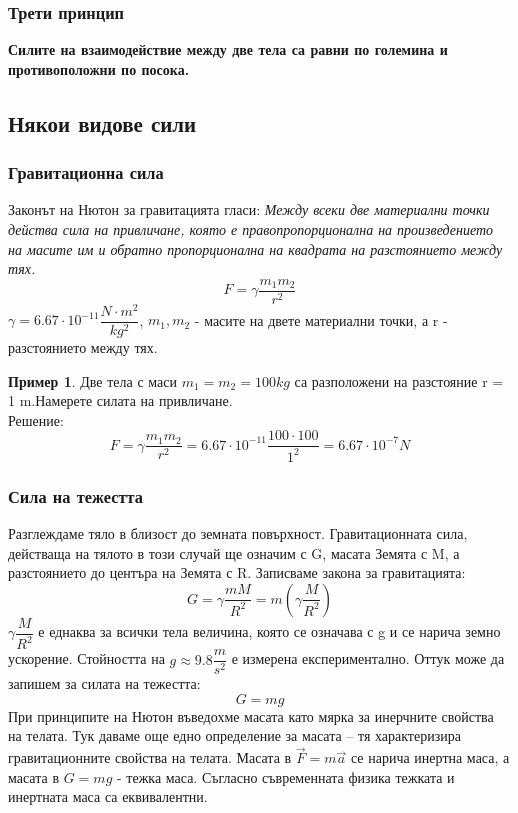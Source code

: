 \documentclass[fleqn, 12pt]{article}
\theoremstyle{definition}
\newtheorem{example}{Пример}[subsection]
\begin{document}
\subsubsection{Трети принцип}
\textbf{Силите на взаимодействие между две тела са равни по големина и противоположни по посока.}

\subsection{Някои видове сили}

\subsubsection{Гравитационна сила}
Законът на Нютон за гравитацията гласи: \textit{Между всеки две материални точки действа сила на привличане, която е правопропорционална на произведението на масите им и обратно пропорционална на квадрата на разстоянието между тях.} \\
$$F = \gamma \dfrac{m_1 m_2}{r^2}$$
$\gamma = 6.67 \cdot 10^{-11} \dfrac{N \cdot m^2}{kg^2}$, $m_1, m_2$ - масите на двете материални точки, а r - разстоянието между тях. 

\begin{example}
Две тела с маси $m_1 =m_2 = 100 kg$ са разположени на разстояние r = 1 m.Намерете силата на привличане. \\
Решение: \\
$$F = \gamma \dfrac{m_1 m_2}{r^2} =  6.67 \cdot 10^{-11}  \dfrac{100 \cdot 100}{1^2} = 6.67 \cdot 10^{-7} N$$
\end{example}


\subsubsection{Сила на тежестта}
Разглеждаме тяло в близост до земната повърхност. Гравитационната сила, действаща на тялото в този случай ще означим с G, масата Земята с M, а разстоянието до центъра на Земята с R. Записваме закона за гравитацията:
$$G = \gamma \dfrac{mM}{R^2} = m \left( \gamma \dfrac{M}{R^2} \right)$$
$\gamma \dfrac{M}{R^2} $ е еднаква за всички тела величина, която се означава с g и се нарича земно ускорение. Стойността на $g \approx 9.8 \dfrac{m}{s^2}$ е измерена експериментално. Оттук може да запишем за силата на тежестта:
$$G = mg$$
При принципите на Нютон въведохме масата като мярка за инерчните свойства на телата. Тук даваме още едно определение за масата – тя характеризира гравитационните свойства на телата. Масата в  $\vec{F} = m \vec{a}$ се нарича инертна маса, а масата в $G = mg$ - тежка маса. Съгласно съвременната физика тежката и инертната маса са еквивалентни.
\end{document}
